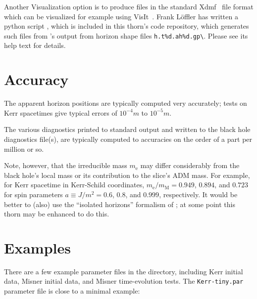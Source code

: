 Another Visualization option is to produce files in the standard
Xdmf~\cite{AHFinderDirect/Xdmf:web} file format which can be visualized for
example using VisIt~\cite{AHFinderDirect/VisIt:web}. Frank L\"offler has
written a python script , which is included in this
thorn's code repository, which generates such files from
's output from horizon shape files
\verb|h.t%d.ah%d.gp\|. Please see its help text for details.


\section{Accuracy}

The apparent horizon positions are typically computed very accurately;
tests on Kerr spacetimes give typical errors of $10^{-4}m$ to $10^{-5}m$.

The various diagnostics printed to standard output and written to the
black hole diagnostics file(s), are typically computed to accuracies
on the order of a part per million or so.

Note, however, that the irreducible mass $m_{\text{e}}$
may differ considerably from the black hole's local mass or its
contribution to the slice's ADM mass.  For example, for Kerr spacetime
in Kerr-Schild coordinates,
$m_{\text{e}}/m_{\text{M}} = 0.949$, $0.894$, and $0.723$
for spin parameters $a \equiv J/m^2 = 0.6$, $0.8$, and $0.999$, respectively.
It would be better to (also) use the ``isolated horizons'' formalism of
\cite{AHFinderDirect/Dreyer-etal-2002-isolated-horizons};
at some point this thorn may be enhanced to do this.


\section{Examples}
\label{AHFinderDirect/sect-examples}

There are a few example parameter files in the  directory,
including Kerr initial data, Misner initial data, and Misner time-evolution
tests.  The \verb|Kerr-tiny.par| parameter file is close to a minimal
 example:

